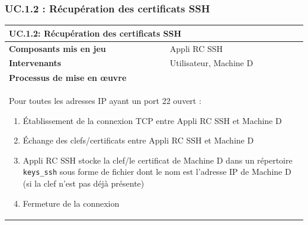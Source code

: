 \documentclass[a4paper,11pt,french]{article}
\begin{document}
\subsubsection{UC.1.2 : Récupération des certificats SSH}
\begin{center}
	\begin{tabularx}{16cm}{|l|X|}
	\hline
	\multicolumn{2}{|l|}{\textbf{UC.1.2: Récupération des certificats SSH}}\\
	\hline
	\textbf{Composants mis en jeu} & Appli RC SSH\\
	\hline
	\textbf{Intervenants} & Utilisateur, Machine D\\
	\hline
	\multicolumn{2}{|l|}{\textbf{Processus de mise en \oe uvre}}\\
	\hline
	\multicolumn{2}{|p{15cm}|}{
    Pour toutes les adresses IP ayant un port 22 ouvert :
	\begin{enumerate}
	\item Établissement de la connexion TCP entre Appli RC SSH et Machine D
	\item Échange des clefs/certificats entre Appli RC SSH et Machine D
	\item Appli RC SSH stocke la clef/le certificat de Machine D dans un répertoire \verb+keys_ssh+ sous forme de fichier dont le nom est l'adresse IP de Machine D (si la clef n'est pas déjà présente)
	\item Fermeture de la connexion
	\end{enumerate}
	}\\
	\hline
	\end{tabularx}
\end{center}
\end{document}
